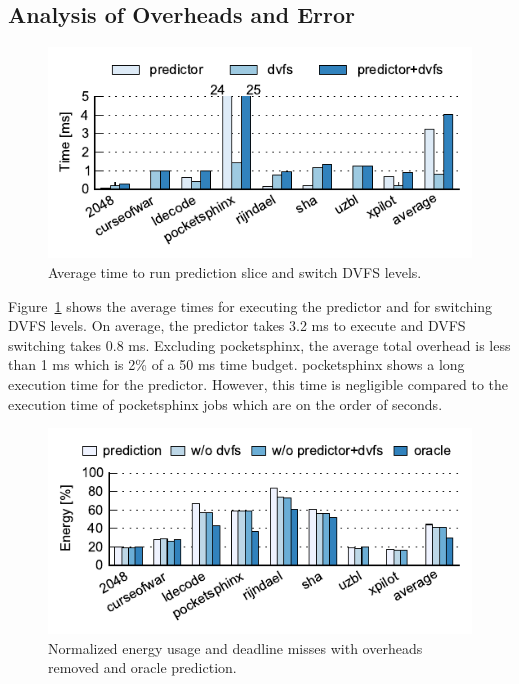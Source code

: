 \subsection{Analysis of Overheads and Error}
\label{sec:exec_time_prediction.evaluation.overheads}

\begin{figure}
  \begin{center}
    \includegraphics{exec_time_prediction/data/overhead_time.pdf}
    \caption{Average time to run prediction slice and switch DVFS levels.}
    \label{fig:exec_time_prediction.evaluation.overhead_time}
  \end{center}
\end{figure}

Figure~\ref{fig:exec_time_prediction.evaluation.overhead_time} shows the
average times for executing the predictor and for switching DVFS levels.  On
average, the predictor takes 3.2 ms to execute and DVFS switching takes 0.8 ms.
Excluding pocketsphinx, the average total overhead is less than 1 ms which is
2\% of a 50 ms time budget.  pocketsphinx shows a long execution time for the
predictor. However, this time is negligible compared to the execution time of
pocketsphinx jobs which are on the order of seconds.

\begin{figure}
  \begin{center}
    \includegraphics{exec_time_prediction/data/overhead_comparison.pdf}
    \caption{Normalized energy usage and deadline misses with overheads removed
    and oracle prediction.}
    \label{fig:exec_time_prediction.evaluation.overhead_comparison}
  \end{center}
\end{figure}

